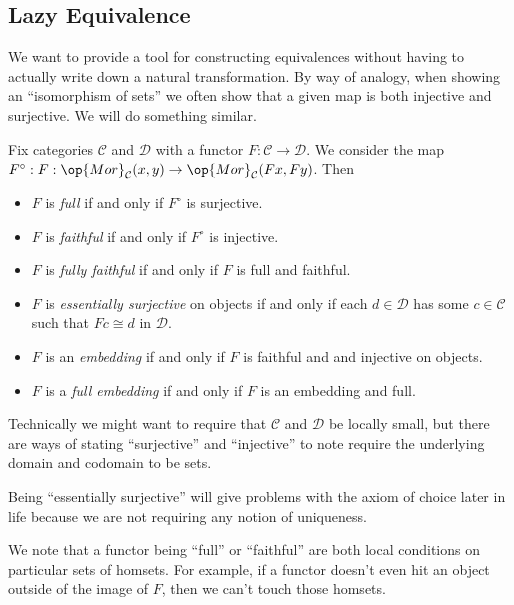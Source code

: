 \subsection{Lazy Equivalence}
We want to provide a tool for constructing equivalences without having to actually write down a natural transformation. By way of analogy, when showing an ``isomorphism of sets'' we often show that a given map is both injective and surjective. We will do something similar.
\begin{definition}
	Fix categories $\mathcal C$ and $\mathcal D$ with a functor $F:\mathcal C\to\mathcal D$. We consider the map $F^\circ:F:\op{Mor}_\mathcal C(x,y)\to\op{Mor}_\mathcal C(Fx,Fy)$. Then
	\begin{itemize}
		\item $F$ is \textit{full} if and only if $F^\circ$ is surjective.
		\item $F$ is \textit{faithful} if and only if $F^\circ$ is injective.
		\item $F$ is \textit{fully faithful} if and only if $F$ is full and faithful.
		\item $F$ is \textit{essentially surjective} on objects if and only if each $d\in\mathcal D$ has some $c\in\mathcal C$ such that $Fc\cong d$ in $\mathcal D$.
		\item $F$ is an \textit{embedding} if and only if $F$ is faithful and and injective on objects.
		\item $F$ is a \textit{full embedding} if and only if $F$ is an embedding and full.
	\end{itemize}
\end{definition}
\begin{remark}
	Technically we might want to require that $\mathcal C$ and $\mathcal D$ be locally small, but there are ways of stating ``surjective'' and ``injective'' to note require the underlying domain and codomain to be sets.
\end{remark}
\begin{remark}
	Being ``essentially surjective'' will give problems with the axiom of choice later in life because we are not requiring any notion of uniqueness.
\end{remark}
We note that a functor being ``full'' or ``faithful'' are both local conditions on particular sets of homsets. For example, if a functor doesn't even hit an object outside of the image of $F$, then we can't touch those homsets.
